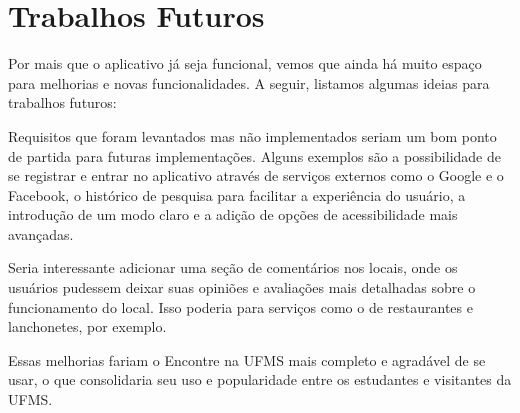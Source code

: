 \section{Trabalhos Futuros}
\label{sec:trabalhos_futuros}

    Por mais que o aplicativo já seja funcional, vemos que ainda há muito espaço para melhorias e novas funcionalidades. A seguir, listamos algumas ideias para trabalhos futuros:
    
    Requisitos que foram levantados mas não implementados seriam um bom ponto de partida para futuras implementações. Alguns exemplos são a possibilidade de se registrar e entrar no aplicativo através de serviços externos como o Google e o Facebook, o histórico de pesquisa para facilitar a experiência do usuário, a introdução de um modo claro e a adição de opções de acessibilidade mais avançadas.
    
    Seria interessante adicionar uma seção de comentários nos locais, onde os usuários pudessem deixar suas opiniões e avaliações mais detalhadas sobre o funcionamento do local. Isso poderia para serviços como o de restaurantes e lanchonetes, por exemplo.

    Essas melhorias fariam o Encontre na UFMS mais completo e agradável de se usar, o que consolidaria seu uso e popularidade entre os estudantes e visitantes da UFMS.